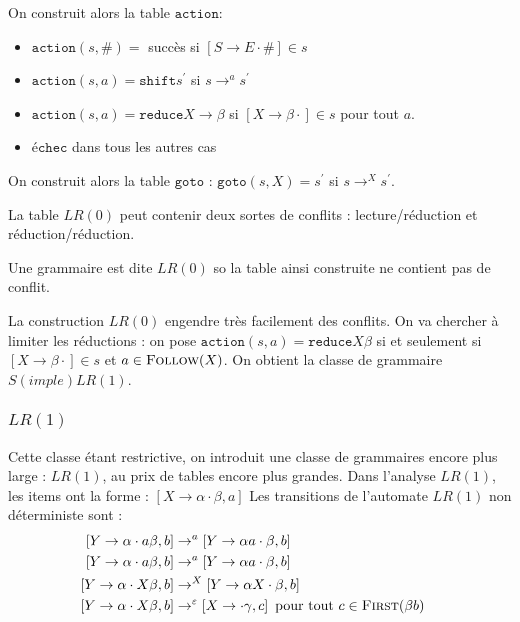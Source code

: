 \documentclass{cours}
\begin{document}
On construit alors la table $\texttt{action}$:
\begin{itemize}
    \item $\texttt{action}(s, \#) = $ succès si $\left[S \rightarrow E \cdot \#\right] \in s$
    \item $\texttt{action}(s, a) = \texttt{shift} s^{'}$ si $s\rightarrow^{a} s^{'}$
    \item $\texttt{action}(s, a) = \texttt{reduce} X \rightarrow \beta$ si $\left[X \rightarrow \beta\cdot \right] \in s$ pour tout $a$.
    \item $\texttt{échec}$ dans tous les autres cas
\end{itemize}

On construit alors la table $\texttt{goto}$ : $\texttt{goto}(s, X) = s^{'}$ si $s \rightarrow^{X} s^{'}$.

La table $LR(0)$ peut contenir deux sortes de conflits : lecture/réduction et réduction/réduction.
\begin{definition}
    Une grammaire est dite $LR(0)$ so la table ainsi construite ne contient pas de conflit.
\end{definition}
La construction $LR(0)$ engendre très facilement des conflits. On va chercher à limiter les réductions :
on pose $\texttt{action}(s, a) = \texttt{reduce} X \beta$ si et seulement si $\left[X \rightarrow \beta\cdot\right] \in s$ et $a \in \textsc{Follow}(X)$. On obtient la classe de grammaire $S(imple)LR(1)$.

\subsubsection{$LR(1)$}
Cette classe étant restrictive, on introduit une classe de grammaires encore plus large : $LR(1)$, au prix de tables encore plus grandes. Dans l'analyse $LR(1)$, les items ont la forme : $\left[X \rightarrow \alpha \cdot \beta, a\right]$
Les transitions de l'automate $LR(1)$ non déterministe sont :
\begin{equation*}
    \begin{aligned}
        \left[Y \rightarrow \alpha \cdot a\beta, b\right] & \rightarrow^{a} \left[Y \rightarrow \alpha a \cdot \beta, b\right]                                                & \\\left[Y \rightarrow \alpha \cdot a\beta, b\right] &\rightarrow^{a} \left[Y \rightarrow \alpha a \cdot \beta, b\right]&\\
        \left[Y \rightarrow \alpha \cdot X\beta, b\right] & \rightarrow^{X} \left[Y \rightarrow \alpha X \cdot \beta, b\right]                                                & \\
        \left[Y \rightarrow \alpha \cdot X\beta, b\right] & \rightarrow^{\epsilon} \left[X \rightarrow \cdot\gamma, c\right] \text{ pour tout } c \in \textsc{First}(\beta b) &
    \end{aligned}
\end{equation*}
\end{document}
